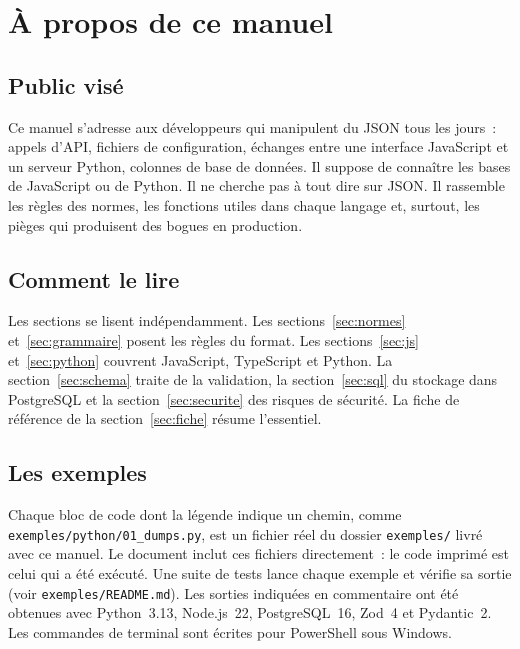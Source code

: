 \documentclass[12pt,a4paper]{article}
\begin{document}
\section{À propos de ce manuel}

\subsection{Public visé}
Ce manuel s'adresse aux développeurs qui manipulent du JSON tous les jours~: appels d'API, fichiers de configuration, échanges entre une interface JavaScript et un serveur Python, colonnes de base de données. Il suppose de connaître les bases de JavaScript ou de Python. Il ne cherche pas à tout dire sur JSON. Il rassemble les règles des normes, les fonctions utiles dans chaque langage et, surtout, les pièges qui produisent des bogues en production.

\subsection{Comment le lire}
Les sections se lisent indépendamment. Les sections~\ref{sec:normes} et~\ref{sec:grammaire} posent les règles du format. Les sections~\ref{sec:js} et~\ref{sec:python} couvrent JavaScript, TypeScript et Python. La section~\ref{sec:schema} traite de la validation, la section~\ref{sec:sql} du stockage dans PostgreSQL et la section~\ref{sec:securite} des risques de sécurité. La fiche de référence de la section~\ref{sec:fiche} résume l'essentiel.

\subsection{Les exemples}
Chaque bloc de code dont la légende indique un chemin, comme \nolinkurl{exemples/python/01_dumps.py}, est un fichier réel du dossier \texttt{exemples/} livré avec ce manuel. Le document inclut ces fichiers directement~: le code imprimé est celui qui a été exécuté. Une suite de tests lance chaque exemple et vérifie sa sortie (voir \texttt{exemples/README.md}). Les sorties indiquées en commentaire ont été obtenues avec Python~3.13, Node.js~22, PostgreSQL~16, Zod~4 et Pydantic~2. Les commandes de terminal sont écrites pour PowerShell sous Windows.

\end{document}
